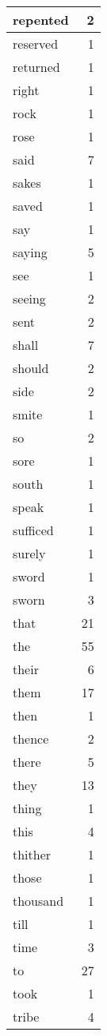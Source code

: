 \begin{center}
\begin{longtable}{l|r}
repented & 2 \\ \hline
reserved & 1 \\ \hline
returned & 1 \\ \hline
right & 1 \\ \hline
rock & 1 \\ \hline
rose & 1 \\ \hline
said & 7 \\ \hline
sakes & 1 \\ \hline
saved & 1 \\ \hline
say & 1 \\ \hline
saying & 5 \\ \hline
see & 1 \\ \hline
seeing & 2 \\ \hline
sent & 2 \\ \hline
shall & 7 \\ \hline
should & 2 \\ \hline
side & 2 \\ \hline
smite & 1 \\ \hline
so & 2 \\ \hline
sore & 1 \\ \hline
south & 1 \\ \hline
speak & 1 \\ \hline
sufficed & 1 \\ \hline
surely & 1 \\ \hline
sword & 1 \\ \hline
sworn & 3 \\ \hline
that & 21 \\ \hline
the & 55 \\ \hline
their & 6 \\ \hline
them & 17 \\ \hline
then & 1 \\ \hline
thence & 2 \\ \hline
there & 5 \\ \hline
they & 13 \\ \hline
thing & 1 \\ \hline
this & 4 \\ \hline
thither & 1 \\ \hline
those & 1 \\ \hline
thousand & 1 \\ \hline
till & 1 \\ \hline
time & 3 \\ \hline
to & 27 \\ \hline
took & 1 \\ \hline
tribe & 4 \\ \hline

\end{longtable}
\end{center}
